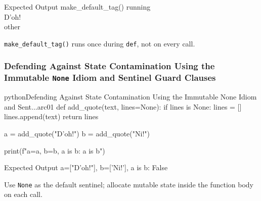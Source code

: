 \begin{iobox}{Expected Output}
make\_default\_tag() running \\
D'oh! \\
other \\
\end{iobox}




\texttt{make\_default\_tag()} runs once during \texttt{def}, not on every call.

\subsubsection{Defending Against State Contamination Using the Immutable \texttt{None} Idiom and Sentinel Guard Clauses}

\begin{codebox}[]{python}{Defending Against State Contamination Using the Immutable None Idiom and Sent...}{arc01}
def add_quote(text, lines=None):
    if lines is None:
        lines = []
    lines.append(text)
    return lines

a = add_quote("D'oh!")
b = add_quote("Ni!")

print(f"a={a}, b={b}, a is b: {a is b}")
\end{codebox}


\begin{iobox}{Expected Output}
a=["D'oh!"], b=['Ni!'], a is b: False \\
\end{iobox}




Use \texttt{None} as the default sentinel; allocate mutable state inside the function body on each call.
